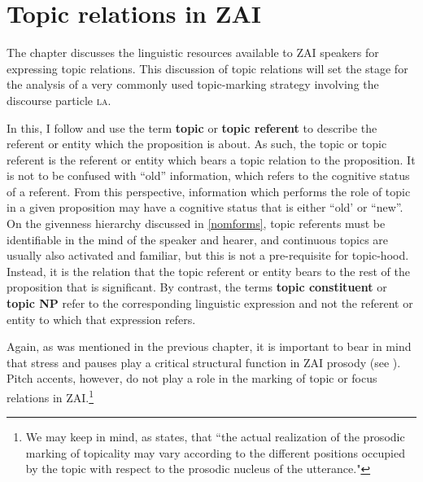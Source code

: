 

%

\chapter{Topic relations in ZAI}\label{topicchapter}

The chapter discusses the linguistic resources available to ZAI speakers for expressing topic relations. This discussion of topic relations will set the stage for the analysis of a very commonly used topic-marking strategy involving the discourse particle \textsc{la}.

In this, I follow \citet{lambrecht1994} and use the term \textbf{topic} or \textbf{topic referent} to describe the referent or entity which the proposition is about. As such, the topic or topic referent is the referent or entity which bears a topic relation to the proposition. It is not to be confused with ``old'' information, which refers to the cognitive status of a referent. From this perspective, information which performs the role of topic in a given proposition may have a cognitive status that is either ``old' or ``new''. On the givenness hierarchy discussed in \ref{nomforms}, topic referents must be identifiable in the mind of the speaker and hearer, and continuous topics are usually also activated and familiar, but this is not a pre-requisite for topic-hood. Instead, it is the relation that the topic referent or entity bears to the rest of the proposition that is significant. By contrast, the terms \textbf{topic constituent} or \textbf{topic NP} refer to the corresponding linguistic expression and not the referent or entity to which that expression refers. 

Again, as was mentioned in the previous chapter, it is important to bear in mind that stress and pauses play a critical structural function in ZAI prosody (see ). Pitch accents, however, do not play a role in the marking of topic or focus relations in ZAI.\footnote{We may keep in mind, as \citet[15]{crocco2009} states, that ``the actual realization of the prosodic marking of topicality may vary according to the different positions occupied by the topic with respect to the prosodic nucleus of the utterance."} 

 

